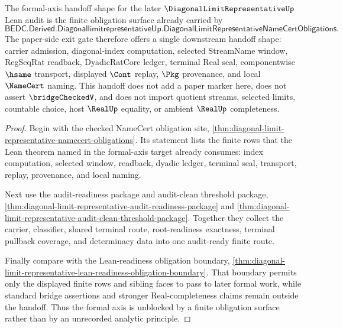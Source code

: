 \begin{theorem}
\label{thm:diagonal-limit-representative-formal-axis-unblock}
The formal-axis handoff shape for the later $\DiagonalLimitRepresentativeUp$ Lean audit is the finite obligation surface already carried by
$$
\mathsf{BEDC.Derived.DiagonallimitrepresentativeUp.DiagonalLimitRepresentativeNameCertObligations}.
$$
The paper-side exit gate therefore offers a single downstream handoff shape: carrier admission, diagonal-index computation, selected StreamName window, RegSeqRat readback, DyadicRatCore ledger, terminal Real seal, componentwise $\hsame$ transport, displayed $\Cont$ replay, $\Pkg$ provenance, and local $\NameCert$ naming. This handoff does not add a paper marker here, does not assert $\bridgeCheckedV$, and does not import quotient streams, selected limits, countable choice, host $\RealUp$ equality, or ambient $\RealUp$ completeness.
\end{theorem}
\begin{proof}
Begin with the checked NameCert obligation site, \autoref{thm:diagonal-limit-representative-namecert-obligations}. Its statement lists the finite rows that the Lean theorem named in the formal-axis target already consumes: index computation, selected window, readback, dyadic ledger, terminal seal, transport, replay, provenance, and local naming.

Next use the audit-readiness package and audit-clean threshold package, \autoref{thm:diagonal-limit-representative-audit-readiness-package} and \autoref{thm:diagonal-limit-representative-audit-clean-threshold-package}. Together they collect the carrier, classifier, shared terminal route, root-readiness exactness, terminal pullback coverage, and determinacy data into one audit-ready finite route.

Finally compare with the Lean-readiness obligation boundary, \autoref{thm:diagonal-limit-representative-lean-readiness-obligation-boundary}. That boundary permits only the displayed finite rows and sibling faces to pass to later formal work, while standard bridge assertions and stronger Real-completeness claims remain outside the handoff. Thus the formal axis is unblocked by a finite obligation surface rather than by an unrecorded analytic principle.
\end{proof}
